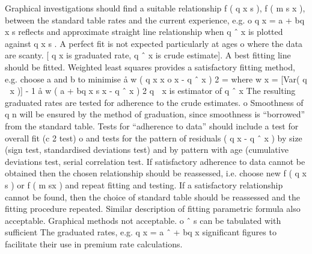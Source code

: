 \documentclass[a4paper,12pt]{article}
\begin{document}
Graphical investigations should find a suitable relationship f ( q x s ), f ( m s x ),
between the standard table rates and the current experience, e.g.
o
q x = a + bq x s reflects and approximate straight line relationship when q ˆ x
is plotted against q x s . A perfect fit is not expected particularly at ages
o
where the data are scanty. [ q x is graduated rate, q ˆ x is crude estimate].
A best fitting line should be fitted. Weighted least squares provides a
satisfactory fitting method, e.g. choose a and b to minimise
å w ( q
x
x
o
x
- q ˆ x ) 2 =
where w x = [Var( q  x )] - 1
å w ( a + bq
x
s
x
- q ˆ x ) 2
q  x is estimator of q ˆ x
The resulting graduated rates are tested for adherence to the crude
estimates.
o
Smoothness of q n will be ensured by the method of graduation, since
smoothness is “borrowed” from the standard table.
Tests for “adherence to data” should include a test for overall fit (c 2 test)
o
and tests for the pattern of residuals ( q x - q ˆ x )
by size (sign test, standardised deviations test)
and by pattern with age (cumulative deviations test, serial correlation
test.
If satisfactory adherence to data cannot be obtained then the chosen
relationship should be reassessed, i.e. choose new f ( q x s ) or f ( m sx ) and
repeat fitting and testing.
If a satisfactory relationship cannot be found, then the choice of standard
table should be reassessed and the fitting procedure repeated.
Similar description of fitting parametric formula also acceptable.
Graphical methods not acceptable.
o
ˆ s can be tabulated with sufficient
The graduated rates, e.g. q x = a ˆ + bq
x
significant figures to facilitate their use in premium rate calculations.
\end{document}
